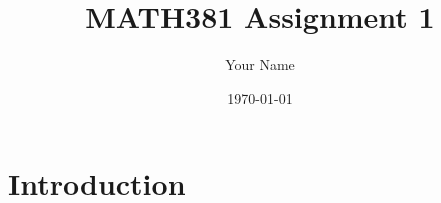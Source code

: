 \documentclass{article}
\title{MATH381 Assignment 1}
\author{Your Name}
\date{\today}
\begin{document}
\maketitle

\section*{Introduction}

\end{document}
